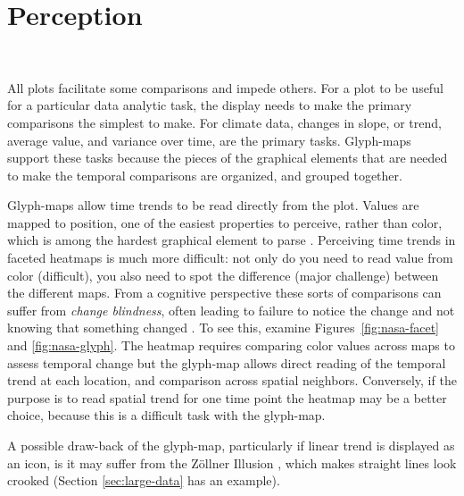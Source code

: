 \documentclass[oneside]{article}
\begin{document}
\section{Perception}~\label{sec:perception}

All plots facilitate some comparisons and impede others. For a plot to be useful for a particular data analytic task, the display needs to make the primary comparisons the simplest to make. For climate data, changes in slope, or trend, average value, and variance over time, are the primary tasks. Glyph-maps support these tasks because the pieces of the graphical elements that are needed to make the temporal comparisons are organized, and grouped together.

Glyph-maps allow time trends to be read directly from the plot. Values are mapped to position, one of the easiest properties to perceive, rather than color, which is among the hardest graphical element to parse \citep{cleveland:1984}. Perceiving time trends in faceted heatmaps is much more difficult: not only do you need to read value from color (difficult), you also need to spot the difference (major challenge) between the different maps. From a cognitive perspective these sorts of comparisons can suffer from \emph{change blindness}, often leading to failure to notice the change and not knowing that something changed \citep{healey:2011,busey}. To see this, examine Figures~\ref{fig:nasa-facet} and \ref{fig:nasa-glyph}. The heatmap requires comparing color values across maps to assess temporal change but the glyph-map allows direct reading of the temporal trend at each location, and comparison across spatial neighbors. Conversely, if the purpose is to read spatial trend for one time point the heatmap may be a better choice, because this is a difficult task with the glyph-map. 


A possible draw-back of the glyph-map, particularly if linear trend is displayed as an icon, is it may suffer from the Z\"ollner Illusion \citep{Zollner}, which makes straight lines look crooked (Section \ref{sec:large-data} has an example).
\end{document}
